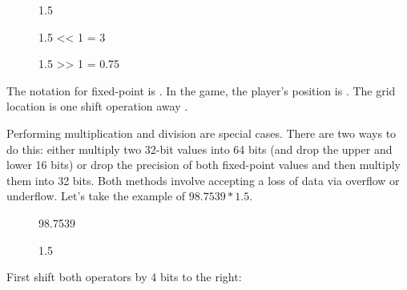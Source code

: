  \par
\begin{figure}[H]
 \centering
   
   \caption{1.5} 
\end{figure} 

\par
\begin{figure}[H]
 \centering
   
   \caption{1.5 << 1  = 3} 
\end{figure}

\par
\begin{figure}[H]
 \centering
   
   \caption{1.5 >> 1 = 0.75} 
\end{figure}

The notation for fixed-point is . In the game, the player's position is . The grid location is one shift operation away .\\
\par
Performing multiplication and division are special cases. There are two ways to do this: either multiply two 32-bit values into 64 bits (and drop the upper and lower 16 bits) or drop the precision of both fixed-point values and then multiply them into 32 bits. Both methods involve accepting a loss of data via overflow or underflow. Let's take the example of $98.7539 * 1.5$.


\par
\begin{figure}[H]
 \centering
   
   \caption{98.7539} 
\end{figure} 
\par
\begin{figure}[H]
 \centering
   
   \caption{1.5} 
\end{figure} 
\par
First shift both operators by 4 bits to the right:\\
\par
\begin{figure}[H]
 \centering
   
\end{figure} 
\par
\begin{figure}[H]
 \centering
   
\end{figure} 
\par

